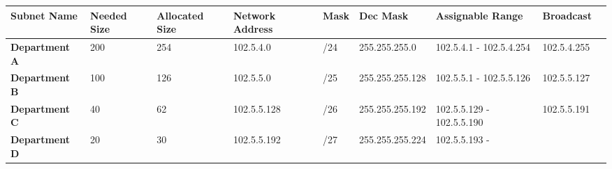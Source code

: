 \documentclass[a4paper,11pt]{article}
\begin{document}
\begin{A}
{        \begin{table}[H]
            \centering
            \setlength{\extrarowheight}{0pt}
            \addtolength{\extrarowheight}{\aboverulesep}
            \addtolength{\extrarowheight}{\belowrulesep}
            \setlength{\aboverulesep}{0pt}
            \setlength{\belowrulesep}{0pt}
            \begin{tabular}{ m{8em}| m{3em}| m{4em}| m{5em}| m{2em}| m{7em}| m{5em}| m{5em}| m{5em}|}
                \toprule
                \rowcolor[rgb]{0.416,0.702,0.961} \textbf{ Subnet Name }    & \textbf{ Needed Size } & \textbf{ Allocated Size } & \textbf{Network Address } & \textbf{ Mask } & \textbf{ Dec Mask } & \textbf{ Assignable Range } & \textbf{ Broadcast } \\
                \hline
                {\cellcolor[rgb]{0.129,0.816,0.557}}\textbf{ Department A } & 200                    & 254                       & 102.5.4.0                 & /24             & 255.255.255.0       & 102.5.4.1 -
                102.5.4.254                                                 & 102.5.4.255                                                                                                                                                                 \\
                \hline
                {\cellcolor[rgb]{0.129,0.816,0.557}}\textbf{ Department B } & 100                    & 126                       & 102.5.5.0                 & /25             & 255.255.255.128     & 102.5.5.1 -
                102.5.5.126                                                 & 102.5.5.127                                                                                                                                                                 \\
                \hline
                {\cellcolor[rgb]{0.129,0.816,0.557}}\textbf{ Department C } & 40                     & 62                        & 102.5.5.128               & /26             & 255.255.255.192     & 102.5.5.129 -
                102.5.5.190                                                 & 102.5.5.191                                                                                                                                                                 \\
                \hline
                {\cellcolor[rgb]{0.129,0.816,0.557}}\textbf{ Department D } & 20                     & 30                        & 102.5.5.192               & /27             & 255.255.255.224     & 102.5.5.193 -

\end{tabular}
\end{table}}
\end{A}
\end{document}
